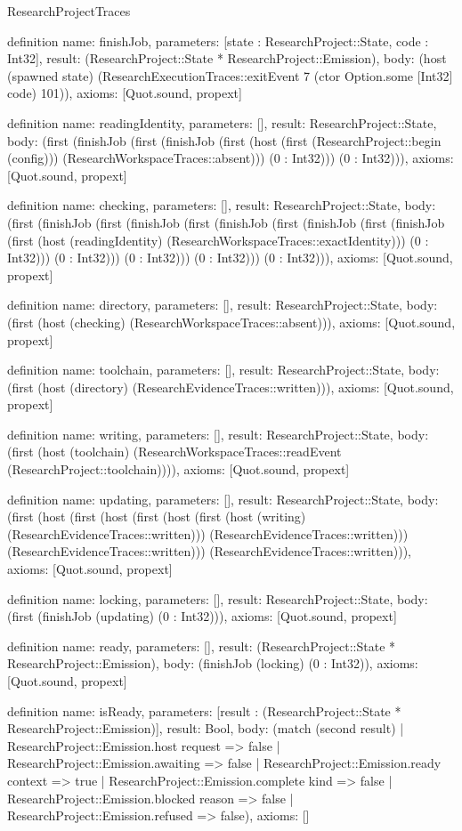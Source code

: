 \begin{lexlean}{ResearchProjectTraces}
\begin{semanticmodule}
definition{
 name: finishJob,
 parameters: [state : ResearchProject::State, code : Int32],
 result: (ResearchProject::State * ResearchProject::Emission),
 body: (host (spawned state) (ResearchExecutionTraces::exitEvent 7 (ctor Option.some [Int32] code) 101)),
 axioms: [Quot.sound, propext]
}

definition{
 name: readingIdentity,
 parameters: [],
 result: ResearchProject::State,
 body: (first (finishJob (first (finishJob (first (host (first (ResearchProject::begin (config))) (ResearchWorkspaceTraces::absent))) (0 : Int32))) (0 : Int32))),
 axioms: [Quot.sound, propext]
}

definition{
 name: checking,
 parameters: [],
 result: ResearchProject::State,
 body: (first (finishJob (first (finishJob (first (finishJob (first (finishJob (first (finishJob (first (host (readingIdentity) (ResearchWorkspaceTraces::exactIdentity))) (0 : Int32))) (0 : Int32))) (0 : Int32))) (0 : Int32))) (0 : Int32))),
 axioms: [Quot.sound, propext]
}

definition{
 name: directory,
 parameters: [],
 result: ResearchProject::State,
 body: (first (host (checking) (ResearchWorkspaceTraces::absent))),
 axioms: [Quot.sound, propext]
}

definition{
 name: toolchain,
 parameters: [],
 result: ResearchProject::State,
 body: (first (host (directory) (ResearchEvidenceTraces::written))),
 axioms: [Quot.sound, propext]
}

definition{
 name: writing,
 parameters: [],
 result: ResearchProject::State,
 body: (first (host (toolchain) (ResearchWorkspaceTraces::readEvent (ResearchProject::toolchain)))),
 axioms: [Quot.sound, propext]
}

definition{
 name: updating,
 parameters: [],
 result: ResearchProject::State,
 body: (first (host (first (host (first (host (first (host (writing) (ResearchEvidenceTraces::written))) (ResearchEvidenceTraces::written))) (ResearchEvidenceTraces::written))) (ResearchEvidenceTraces::written))),
 axioms: [Quot.sound, propext]
}

definition{
 name: locking,
 parameters: [],
 result: ResearchProject::State,
 body: (first (finishJob (updating) (0 : Int32))),
 axioms: [Quot.sound, propext]
}

definition{
 name: ready,
 parameters: [],
 result: (ResearchProject::State * ResearchProject::Emission),
 body: (finishJob (locking) (0 : Int32)),
 axioms: [Quot.sound, propext]
}

definition{
 name: isReady,
 parameters: [result : (ResearchProject::State * ResearchProject::Emission)],
 result: Bool,
 body: (match (second result) | ResearchProject::Emission.host request => false | ResearchProject::Emission.awaiting => false | ResearchProject::Emission.ready context => true | ResearchProject::Emission.complete kind => false | ResearchProject::Emission.blocked reason => false | ResearchProject::Emission.refused => false),
 axioms: []
}


\end{semanticmodule}
\end{lexlean}
